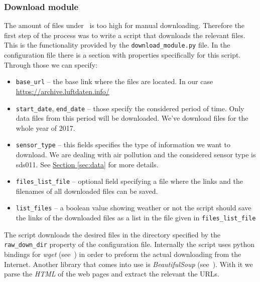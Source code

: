 \documentclass[12pt,a4paper,twoside]{scrartcl}
\numberwithin{equation}{section}
\newcommand{\refsec}[1]{\hyperref[#1]{Section \ref*{#1}}}
\begin{document}
\subsubsection{Download module}\label{sec:down-module}
The amount of files under~\cite{luftdaten} is too high for manual downloading. Therefore the first step of the process was to write a script that downloads the relevant files. This is the functionality provided by the \texttt{download\_module.py} file. In the configuration file there is a section with properties specifically for this script. Through those we can specify:
\begin{itemize}
\item \texttt{base\_url} -- the base link where the files are located. In our case \url{https://archive.luftdaten.info/}
\item \texttt{start\_date}, \texttt{end\_date} -- those specify the considered period of time. Only data files from this period will be downloaded. We've download files for the whole year of 2017.
\item \texttt{sensor\_type} -- this fields specifies the type of information we want to download. We are dealing with air pollution and the considered sensor type is sds011. See \refsec{sec:data} for more details.
\item \texttt{files\_list\_file} -- optional field specifying a file where the links and the filenames of all downloaded files can be saved.
\item \texttt{list\_files} -- a boolean value showing weather or not the script should save the links of the downloaded files as a list in the file given in \texttt{files\_list\_file}
\end{itemize}
The script downloads the desired files in the directory specified by the \texttt{raw\_down\_dir} property of the configuration file. Internally the script uses python bindings for \emph{wget} (see~\cite{wget}) in order to preform the actual downloading from the Internet. Another library that comes into use is \emph{BeautifulSoup} (see~\cite{bs}). With it we parse the \emph{HTML} of the web pages and extract the relevant the URLs.
\end{document}
